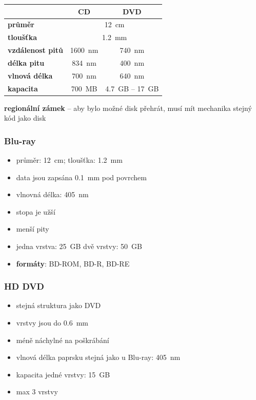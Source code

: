 \documentclass[a4paper,12pt]{article}
\providecommand{\tightlist}{%
\setlength{\itemsep}{0pt}\setlength{\parskip}{0pt}}
\begin{document}
\begin{tabular}{|l|c|c|}
  \hline
  & \textbf{CD} & \textbf{DVD} \\ \hline
  \textbf{průměr} & \multicolumn{2}{|c|}{12~cm} \\ \hline
  \textbf{tloušťka} & \multicolumn{2}{|c|}{1.2~mm} \\ \hline
  \textbf{vzdálenost pitů} & 1600~nm & 740~nm \\ \hline
  \textbf{délka pitu} & 834~nm & 400~nm \\ \hline
  \textbf{vlnová délka} & 700~nm & 640~nm \\ \hline
  \textbf{kapacita} & 700~MB & 4.7~GB -- 17~GB \\ \hline
\end{tabular}

\vspace{5mm}

\textbf{regionální zámek} -- aby bylo možné disk přehrát, musí mít mechanika
stejný kód jako disk

\subsubsection{Blu-ray}

\begin{itemize}
  \tightlist
  \item průměr: 12~cm; tloušťka: 1.2~mm
  \item data jsou zapsána 0.1~mm pod povrchem
  \item vlnovná délka: 405~nm
  \item stopa je užší
  \item menší pity
  \item jedna vrstva: 25~GB \textrightarrow{} dvě vrstvy: 50~GB
  \item \textbf{formáty}: BD-ROM, BD-R, BD-RE
\end{itemize}

\subsubsection{HD DVD}

\begin{itemize}
  \tightlist
  \item stejná struktura jako DVD
  \item vrstvy jsou do 0.6~mm
  \item méně náchylné na poškrábání
  \item vlnová délka paprsku stejná jako u Blu-ray: 405~nm
  \item kapacita jedné vrstvy: 15~GB
  \item max 3 vrstvy
\end{itemize}
\end{document}
